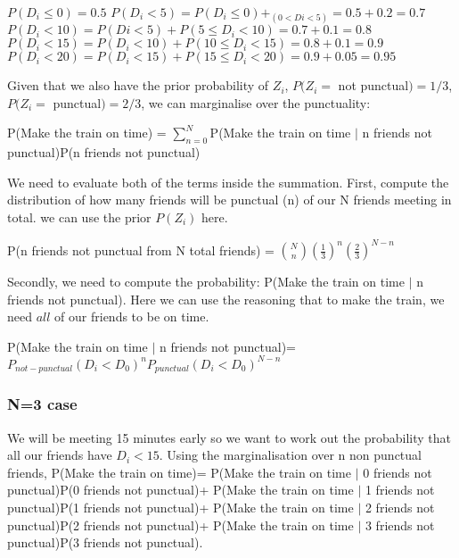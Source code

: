 \documentclass{article}
\begin{document}
\noindent
$P(D_i \leq 0) = 0.5$
\newline
\noindent
$P(D_i < 5) = P(D_i \leq 0) + _(0 < Di < 5) = 0.5 + 0.2 = 0.7$
\newline
\noindent
$P(D_i < 10) = P(Di < 5) + P(5 \leq D_i < 10) = 0.7 + 0.1 = 0.8$
\newline
\noindent
$P(D_i < 15) = P(D_i < 10) + P(10 \leq D_i < 15)= 0.8 + 0.1= 0.9$
\newline
\noindent
$P(D_i < 20) = P(D_i < 15)+P(15 \leq D_i < 20) =0.9 + 0.05= 0.95$
\newline

\noindent
Given that we also have the prior probability of $Z_i$, $P(Z_i=$ not punctual$)=1/3$, $P(Z_i=$ punctual$)=2/3$, we can marginalise over the punctuality: 
\newline

\noindent
P(Make the train on time) = $\sum_{n=0}^{N}$P(Make the train on time $|$ n friends not punctual)P(n friends not punctual)
\newline

\noindent
We need to evaluate both of the terms inside the summation. First, compute the distribution of how many friends will be punctual (n) of our N friends meeting in total. we can use the prior $P(Z_i)$ here. 
\newline

\noindent 
P(n friends not punctual from N total friends) = ${N \choose n}(\frac{1}{3})^n(\frac{2}{3})^{N-n}$ 
\newline

\noindent
Secondly, we need to compute the probability: P(Make the train on time $|$ n friends not punctual). Here we can use the reasoning that to make the train, we need $all$ of our friends to be on time. 
\newline

\noindent
P(Make the train on time $|$ n friends not punctual)= $P_{not- punctual}(D_i<D_0)^{n} P_{punctual}(D_i<D_0)^{N-n}$
\newline

\vspace{5mm}
\subsubsection{N=3 case}
We will be meeting 15 minutes early so we want to work out the probability that all our friends have $D_i<15$.  Using the marginalisation over n non punctual friends, 
\newline
\noindent
P(Make the train on time)=
\newline
\noindent
P(Make the train on time $|$ 0 friends not punctual)P(0 friends not punctual)+
\newline
P(Make the train on time $|$ 1 friends not punctual)P(1 friends not punctual)+
\newline
P(Make the train on time $|$ 2 friends not punctual)P(2 friends not punctual)+
\newline
P(Make the train on time $|$ 3 friends not punctual)P(3 friends not punctual).
\newline
\end{document}
